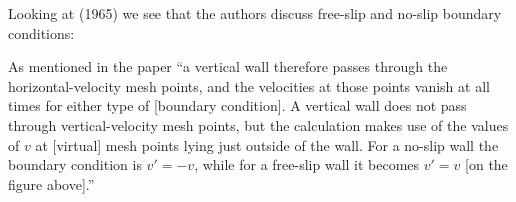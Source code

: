 Looking at \textcite{hawe65} (1965)
we see that the authors discuss free-slip and no-slip boundary conditions:
\begin{center}
\end{center}
As mentioned in the paper ``a vertical wall therefore passes through the horizontal-velocity mesh points,
and the velocities at those points vanish at all times for either type of [boundary condition].
A vertical wall does not pass through vertical-velocity mesh points, but the calculation makes use
of the values of $v$ at [virtual] mesh points lying just outside of the wall. For a no-slip wall
the boundary condition is $v'=-v$, while for a free-slip wall it becomes $v'=v$ [on the figure above].''

